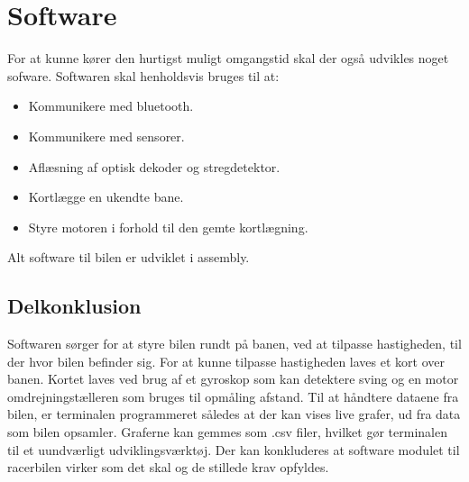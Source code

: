 \newpage
\section{Software}
For at kunne kører den hurtigst muligt omgangstid skal der også udvikles noget sofware. Softwaren skal henholdsvis bruges til at:
\begin{itemize}
\item Kommunikere med bluetooth.
\item Kommunikere med sensorer.
\item Aflæsning af optisk dekoder og stregdetektor.
\item Kortlægge en ukendte bane.
\item Styre motoren i forhold til den gemte kortlægning.
\end{itemize}
Alt software til bilen er udviklet i assembly.











\subsection{Delkonklusion}

Softwaren sørger for at styre bilen rundt på banen, ved at tilpasse hastigheden, til der hvor bilen befinder sig. For at kunne tilpasse hastigheden laves et kort over banen. Kortet laves ved brug af et gyroskop som kan detektere sving og en motor omdrejningstælleren som bruges til opmåling afstand. Til at håndtere dataene fra bilen, er terminalen programmeret således at der kan vises live grafer, ud fra data som bilen opsamler. Graferne kan gemmes som .csv filer, hvilket gør terminalen til et uundværligt udviklingsværktøj. Der kan konkluderes at software modulet til racerbilen virker som det skal og de stillede krav opfyldes. 